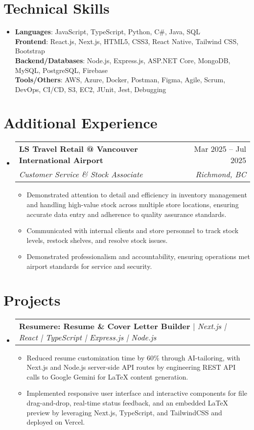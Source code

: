 \documentclass[letterpaper,11pt]{article}
\makeatletter
\newcommand{\resumeItem}[1]{
\item\small{
{#1 \vspace{-2pt}}
}
}
\newcommand{\resumeSubheading}[4]{
\vspace{-2pt}\item
\begin{tabular*}{0.97\textwidth}[t]{l@{\extracolsep{\fill}}r}
\textbf{#1} & #2 \\
\textit{\small#3} & \textit{\small #4} \\
\end{tabular*}\vspace{-7pt}
}
\newcommand{\resumeProjectHeading}[2]{
\item
\begin{tabular*}{0.97\textwidth}{l@{\extracolsep{\fill}}r}
\small#1 & #2 \\
\end{tabular*}\vspace{-7pt}
}
\newcommand{\resumeSubHeadingListStart}{\begin{itemize}[leftmargin=0.15in, label={}]}
\newcommand{\resumeSubHeadingListEnd}{\end{itemize}}
\newcommand{\resumeItemListStart}{\begin{itemize}}
\newcommand{\resumeItemListEnd}{\end{itemize}\vspace{-5pt}}
\makeatother
\begin{document}
\section{Technical Skills} %
\begin{itemize}[leftmargin=0.15in, label={}]
\item{
\textbf{Languages}{: JavaScript, TypeScript, Python, C\#, Java, SQL} \\
\textbf{Frontend}{: React.js, Next.js, HTML5, CSS3, React Native, Tailwind CSS, Bootstrap} \\
\textbf{Backend/Databases}{: Node.js, Express.js, ASP.NET Core, MongoDB, MySQL, PostgreSQL, Firebase} \\
\textbf{Tools/Others}{: AWS, Azure, Docker, Postman, Figma, Agile, Scrum, DevOps, CI/CD, S3, EC2, JUnit, Jest, Debugging}
} \\
\end{itemize}

\section{Additional Experience}
\resumeSubHeadingListStart
\resumeSubheading{LS Travel Retail @ Vancouver International Airport}{Mar 2025 – Jul 2025}{Customer Service \& Stock Associate}{Richmond, BC}
\resumeItemListStart
\resumeItem{Demonstrated attention to detail and efficiency in inventory management and handling high-value stock across multiple store locations, ensuring accurate data entry and adherence to quality assurance standards.}
\resumeItem{Communicated with internal clients and store personnel to track stock levels, restock shelves, and resolve stock issues.}
\resumeItem{Demonstrated professionalism and accountability, ensuring operations met airport standards for service and security.}
\resumeItemListEnd
\resumeSubHeadingListEnd

\section{Projects}
\resumeSubHeadingListStart
\resumeProjectHeading{\textbf{Resumere: Resume \& Cover Letter Builder} $|$ \emph{Next.js | React | TypeScript | Express.js | Node.js}}{}
\resumeItemListStart
\resumeItem{Reduced resume customization time by 60\% through AI-tailoring, with Next.js and Node.js server-side API routes by engineering REST API calls to Google Gemini for LaTeX content generation.}
\resumeItem{Implemented responsive user interface and interactive components for file drag-and-drop, real-time status feedback, and an embedded LaTeX preview by leveraging Next.js, TypeScript, and TailwindCSS and deployed on Vercel.}
\resumeItemListEnd
\resumeSubHeadingListEnd
\end{document}
